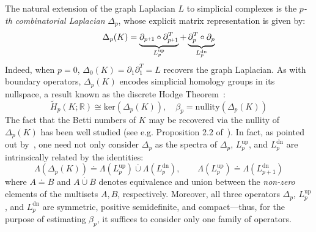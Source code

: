 \documentclass[10pt]{article}
\numberwithin{equation}{section}
\newcommand{\+}{%
	\raisebox{0.18ex}{\scaleobj{0.55}{+}}
}
\theoremstyle{definition}
\theoremstyle{definition}
\begin{document}
The natural extension of the graph Laplacian $L$ to simplicial complexes is the \emph{$p$-th combinatorial Laplacian} $\Delta_p$, whose explicit matrix representation is given by: 
\begin{equation}\label{eq:comb_lap}
	\Delta_p(K) = 
	\underbrace{\partial_{p\+1} \circ \partial_{p\+1}^T}_{L_p^{\text{up}}} + \underbrace{\partial_{p}^T  \circ  \partial_{p}}_{L_p^{\text{dn}}} 
\end{equation}
\noindent Indeed, when $p = 0$, $\Delta_0(K) = \partial_1 \partial_1^T = L$ recovers the graph Laplacian. 
As with boundary operators, $\Delta_p(K)$ encodes simplicial homology groups in its nullspace, a result known as the discrete Hodge Theorem~\cite{}: 
\begin{equation}\label{eq:laplace_hom}
	\tilde{H}_p(K; \mathbb{R}) \cong \mathrm{ker}(\Delta_p(K)), \quad \beta_p = \mathrm{nullity}(\Delta_p(K))
\end{equation}
The fact that the Betti numbers of $K$ may be recovered via the nullity of $\Delta_p(K)$ has been well studied (see e.g. Proposition 2.2 of~\cite{}). 
In fact, as pointed out by~\cite{}, one need not only consider $\Delta_p$ as the spectra of $\Delta_p$, $L_p^{\text{up}}$, and $L_p^{\text{dn}}$ are intrinsically related by the identities:
\begin{equation}\label{eq:lap_spectra_conn}
	\Lambda(\Delta_p(K)) \doteq \Lambda(L_p^{\text{up}}) \stackrel{\cdot}{\cup} \Lambda(L_p^{\text{dn}}), \quad \quad \Lambda(L_p^{\text{up}}) \doteq \Lambda(L_{p+1}^{\text{dn}})
\end{equation}
where $A \doteq B$ and $A \stackrel{\cdot}{\cup} B$ denotes equivalence and union between the \emph{non-zero} elements of the multisets $A, B$, respectively.
Moreover, all three operators $\Delta_p$, $L_p^{\text{up}}$, and $L_p^{\text{dn}}$ are symmetric, positive semidefinite, and compact---thus, for the purpose of estimating $\beta_p$, it suffices to consider only one family of operators.


\end{document}
